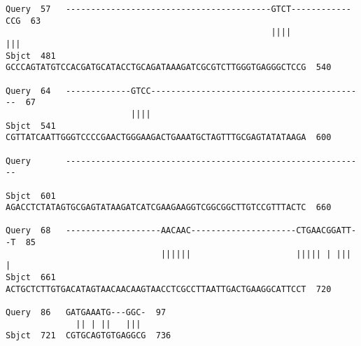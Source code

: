 \documentclass[fleqn,10pt]{article}
\begin{document}
\begin{lstlisting}[style=outputstyle,caption={Resultado detallado del alineamiento entre Secuencia 5 y Secuencia 6}]
Query  57   -----------------------------------------GTCT------------CCG  63
                                                     ||||            |||
Sbjct  481  GCCCAGTATGTCCACGATGCATACCTGCAGATAAAGATCGCGTCTTGGGTGAGGGCTCCG  540

Query  64   -------------GTCC-------------------------------------------  67
                         ||||                                           
Sbjct  541  CGTTATCAATTGGGTCCCCGAACTGGGAAGACTGAAATGCTAGTTTGCGAGTATATAAGA  600

Query       ------------------------------------------------------------  
                                                                        
Sbjct  601  AGACCTCTATAGTGCGAGTATAAGATCATCGAAGAAGGTCGGCGGCTTGTCCGTTTACTC  660

Query  68   -------------------AACAAC---------------------CTGAACGGATT--T  85
                               ||||||                     ||||| | |||  |
Sbjct  661  ACTGCTCTTGTGACATAGTAACAACAAGTAACCTCGCCTTAATTGACTGAAGGCATTCCT  720

Query  86   GATGAAATG---GGC-  97
              || | ||   ||| 
Sbjct  721  CGTGCAGTGTGAGGCG  736
\end{lstlisting}
\end{document}
